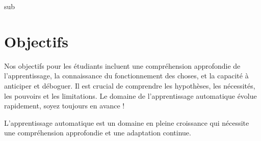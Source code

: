 \documentclass[12pt]{article}
\begin{document}
sub\section{Objectifs}

Nos objectifs pour les étudiants incluent une compréhension approfondie de l'apprentissage, la connaissance du fonctionnement des choses, et la capacité à anticiper et déboguer. Il est crucial de comprendre les hypothèses, les nécessités, les pouvoirs et les limitations. Le domaine de l'apprentissage automatique évolue rapidement, soyez toujours en avance !

\begin{tcolorbox}[title={À retenir}]
L'apprentissage automatique est un domaine en pleine croissance qui nécessite une compréhension approfondie et une adaptation continue.
\end{tcolorbox}

\end{document}
